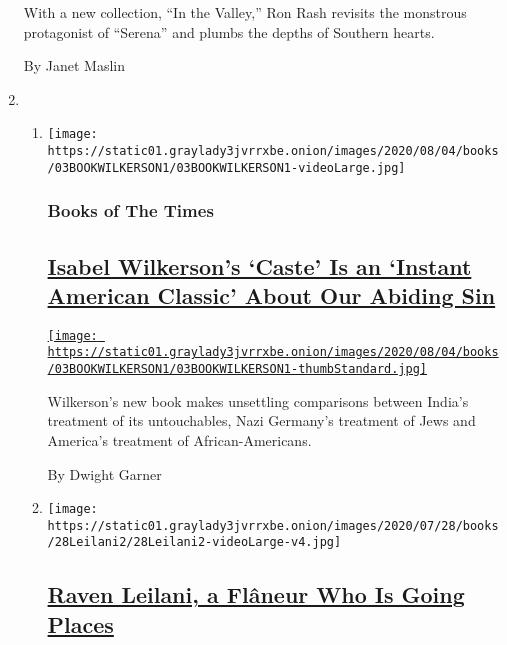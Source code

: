 \begin{enumerate}
  With a new collection, ``In the Valley,'' Ron Rash revisits the
  monstrous protagonist of ``Serena'' and plumbs the depths of Southern
  hearts.

  By Janet Maslin
\item
  \begin{enumerate}
  \def\labelenumii{\arabic{enumii}.}
  \item
    \texttt{[image: https://static01.graylady3jvrrxbe.onion/images/2020/08/04/books/03BOOKWILKERSON1/03BOOKWILKERSON1-videoLarge.jpg]}

    \hypertarget{books-of-the-times-1}{%
    \subsubsection{Books of The Times}\label{books-of-the-times-1}}

    \hypertarget{isabel-wilkersons-caste-is-an-instant-american-classic-about-our-abiding-sin}{%
    \subsection{\texorpdfstring{\href{/2020/07/31/books/review-caste-isabel-wilkerson-origins-of-our-discontents.html}{Isabel
    Wilkerson's `Caste' Is an `Instant American Classic' About Our
    Abiding
    Sin}}{Isabel Wilkerson's `Caste' Is an `Instant American Classic' About Our Abiding Sin}}\label{isabel-wilkersons-caste-is-an-instant-american-classic-about-our-abiding-sin}}

    \href{/2020/07/31/books/review-caste-isabel-wilkerson-origins-of-our-discontents.html}{\texttt{[image: https://static01.graylady3jvrrxbe.onion/images/2020/08/04/books/03BOOKWILKERSON1/03BOOKWILKERSON1-thumbStandard.jpg]}}

    Wilkerson's new book makes unsettling comparisons between India's
    treatment of its untouchables, Nazi Germany's treatment of Jews and
    America's treatment of African-Americans.

    By Dwight Garner
  \item
    \texttt{[image: https://static01.graylady3jvrrxbe.onion/images/2020/07/28/books/28Leilani2/28Leilani2-videoLarge-v4.jpg]}

    \hypertarget{raven-leilani-a-fluxe2neur-who-is-going-places}{%
    \subsection{\texorpdfstring{\href{/2020/07/31/books/raven-leilani-luster.html}{Raven
    Leilani, a Flâneur Who Is Going
    Places}}{Raven Leilani, a Flâneur Who Is Going Places}}\label{raven-leilani-a-fluxe2neur-who-is-going-places}}


\end{enumerate}
\end{enumerate}
